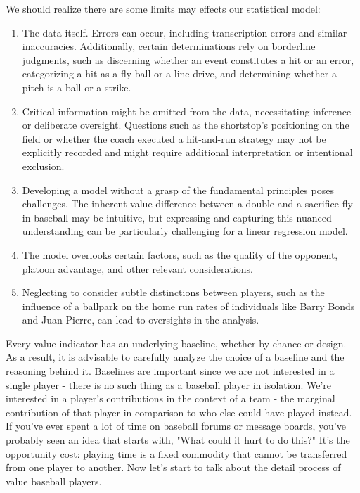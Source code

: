 \documentclass[12pt]{article}
\begin{document}
We should realize there are some limits may effects our statistical model:
\begin{enumerate}
\item The data itself. Errors can occur, including transcription errors and similar inaccuracies. Additionally, 
certain determinations rely on borderline judgments, such as discerning whether an event constitutes a hit or an
error, categorizing a hit as a fly ball or a line drive, and determining whether a pitch is a ball or a strike.

\item Critical information might be omitted from the data, necessitating inference or deliberate oversight. 
Questions such as the shortstop's positioning on the field or whether the coach executed a hit-and-run strategy may 
not be explicitly recorded and might require additional interpretation or intentional exclusion.

\item Developing a model without a grasp of the fundamental principles poses challenges. The inherent value
difference between a double and a sacrifice fly in baseball may be intuitive, but expressing and capturing this 
nuanced understanding can be particularly challenging for a linear regression model.

\item The model overlooks certain factors, such as the quality of the opponent, platoon advantage, and other 
relevant considerations.

\item Neglecting to consider subtle distinctions between players, such as the influence of a ballpark on the home 
run rates of individuals like Barry Bonds and Juan Pierre, can lead to oversights in the analysis.
\end{enumerate}

Every value indicator has an underlying baseline, whether by chance or design. As a result, it is advisable to 
carefully analyze the choice of a baseline and the reasoning behind it. Baselines are important since we are not 
interested in a single player - there is no such thing as a baseball player in isolation. We're interested in a 
player's contributions in the context of a team - the marginal contribution of that player in comparison to who 
else could have played instead. If you've ever spent a lot of time on baseball forums or message boards, you've 
probably seen an idea that starts with, "What could it hurt to do this?" It's the opportunity cost: playing time 
is a fixed commodity that cannot be transferred from one player to another. Now let's start to talk about the
detail process of value baseball players.
\end{document}
